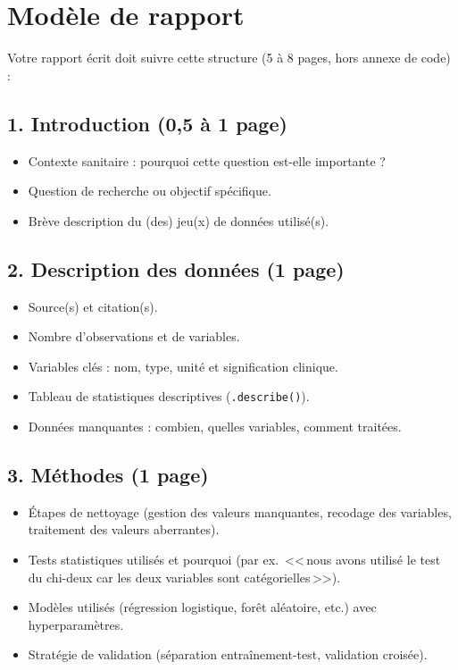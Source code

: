 \section{Mod\`ele de rapport}

Votre rapport \'ecrit doit suivre cette structure (5 \`a 8 pages, hors annexe de code) :

\subsection{1. Introduction (0,5 \`a 1 page)}

\begin{itemize}
  \item Contexte sanitaire : pourquoi cette question est-elle importante ?
  \item Question de recherche ou objectif sp\'ecifique.
  \item Br\`eve description du (des) jeu(x) de donn\'ees utilis\'e(s).
\end{itemize}

\subsection{2. Description des donn\'ees (1 page)}

\begin{itemize}
  \item Source(s) et citation(s).
  \item Nombre d'observations et de variables.
  \item Variables cl\'es : nom, type, unit\'e et signification clinique.
  \item Tableau de statistiques descriptives (\texttt{.describe()}).
  \item Donn\'ees manquantes : combien, quelles variables, comment trait\'ees.
\end{itemize}

\subsection{3. M\'ethodes (1 page)}

\begin{itemize}
  \item \'Etapes de nettoyage (gestion des valeurs manquantes, recodage des variables, traitement des valeurs aberrantes).
  \item Tests statistiques utilis\'es et pourquoi (par ex.\ <<\,nous avons utilis\'e le test du chi-deux car les deux variables sont cat\'egorielles\,>>).
  \item Mod\`eles utilis\'es (r\'egression logistique, for\^et al\'eatoire, etc.) avec hyperparam\`etres.
  \item Strat\'egie de validation (s\'eparation entra\^inement-test, validation crois\'ee).
\end{itemize}


